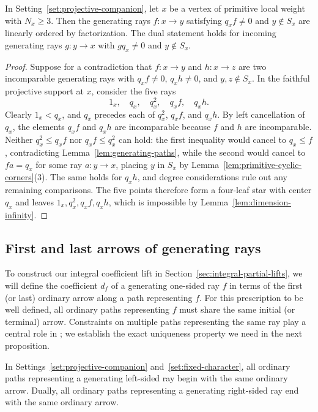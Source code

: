 \begin{lemma}
\label{lem:external-hom-chain}
In Setting~\ref{set:projective-companion}, let $x$ be a vertex of primitive local weight with $N_x\geq3$. Then the generating rays $f\colon x\to y$ satisfying $q_xf\ne0$ and $y\notin S_x$ are linearly ordered by factorization. The dual statement holds for incoming generating rays $g\colon y\to x$ with $gq_x\ne0$ and $y\notin S_x$.
\end{lemma}
\begin{proof}
Suppose for a contradiction that $f\colon x\to y$ and $h\colon x\to z$ are two incomparable generating rays with $q_xf\ne0$, $q_xh\ne0$, and $y,z\notin S_x$. In the faithful projective support at $x$, consider the five rays
\[
  1_x,\quad q_x,\quad q_x^2,\quad q_xf,\quad q_xh.
\]
Clearly $1_x<q_x$, and $q_x$ precedes each of $q_x^2$, $q_xf$, and $q_xh$. By left cancellation of $q_x$, the elements $q_xf$ and $q_xh$ are incomparable because $f$ and $h$ are incomparable. Neither $q_x^2\leq q_xf$ nor $q_xf\leq q_x^2$ can hold: the first inequality would cancel to $q_x\leq f$, contradicting Lemma~\ref{lem:generating-paths}, while the second would cancel to $fa=q_x$ for some ray $a\colon y\to x$, placing $y$ in $S_x$ by Lemma~\ref{lem:primitive-cyclic-corners}(3). The same holds for $q_xh$, and degree considerations rule out any remaining comparisons. The five points therefore form a four-leaf star with center $q_x$ and leaves $1_x,q_x^2,q_xf,q_xh$, which is impossible by Lemma~\ref{lem:dimension-infinity}.
\end{proof}

\subsection{First and last arrows of generating rays}

To construct our integral coefficient lift in Section~\ref{sec:integral-partial-lifts}, we will define the coefficient $d_f$ of a generating one-sided ray $f$ in terms of the first (or last) ordinary arrow along a path representing $f$. For this prescription to be well defined, all ordinary paths representing $f$ must share the same initial (or terminal) arrow. Constraints on multiple paths representing the same ray play a central role in \cite{BGRS,BongartzMild}; we establish the exact uniqueness property we need in the next proposition.

\begin{proposition}
\label{prop:controlled-contours}
In Settings~\ref{set:projective-companion} and~\ref{set:fixed-character}, all ordinary paths representing a generating left-sided ray begin with the same ordinary arrow. Dually, all ordinary paths representing a generating right-sided ray end with the same ordinary arrow.
\end{proposition}

